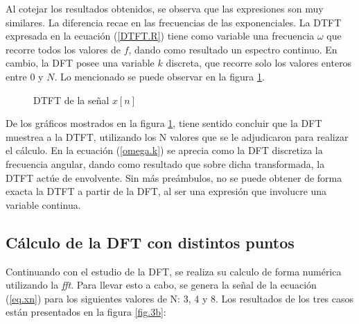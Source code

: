 \documentclass[11pt,a4paper]{article}
\begin{document}
    Al cotejar los resultados obtenidos, se observa que las expresiones son muy similares. La diferencia recae en las frecuencias de las exponenciales. La DTFT expresada en la ecuación (\ref{DTFT.R}) tiene como variable una frecuencia $\omega$ que recorre todos los valores de $f$, dando como resultado un espectro continuo. En cambio, la DFT posee una variable $k$ discreta, que recorre solo los valores enteros entre 0 y $N$. Lo mencionado se puede observar en la figura \ref{fig.3a}.
    
    
    \begin{figure}[htb]
    \centering
	\caption{DTFT de la señal $x[n]$}
	\label{fig.3a}
    \end{figure}
    
    De los gráficos mostrados en la figura \ref{fig.3a}, tiene sentido concluir que la DFT muestrea a la DTFT, utilizando los N valores que se le adjudicaron para realizar el cálculo. En la ecuación (\ref{omega.k}) se aprecia como la DFT discretiza la frecuencia angular, dando como resultado que sobre dicha transformada, la DTFT actúe de envolvente. Sin más preámbulos, no se puede obtener de forma exacta la DTFT a partir de la DFT, al ser una expresión que involucre una variable continua.
    

    \subsection{Cálculo de la DFT con distintos puntos}    
    Continuando con el estudio de la DFT, se realiza su calculo de forma numérica utilizando la \textit{fft}. Para llevar esto a cabo, se genera la señal de la ecuación (\ref{eq.xn}) para los siguientes valores de N: 3, 4 y 8. Los resultados de los tres casos están presentados en la figura \ref{fig.3b}:
\end{document}
